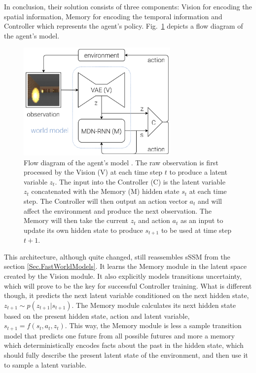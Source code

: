 In conclusion, their solution consists of three components: Vision for encoding the spatial information, Memory for encoding the temporal information and Controller which represents the agent's policy. Fig.~\ref{Fig.WorldModels} depicts a flow diagram of the agent's model.

\begin{figure}[H]
\includegraphics[width=0.7\textwidth,keepaspectratio]{figures/WorldModels.png}
\caption[Flow diagram of the World Models agent's model]{Flow diagram of the agent's model \protect\cite{Algo.WorldModels}. The raw observation is first processed by the Vision (V) at each time step $t$ to produce a latent variable $z_t$. The input into the Controller (C) is the latent variable $z_t$ concatenated with the Memory (M) hidden state $s_t$ at each time step. The Controller will then output an action vector $a_t$ and will affect the environment and produce the next observation. The Memory will then take the current $z_t$ and action $a_t$ as an input to update its own hidden state to produce $s_{t+1}$ to be used at time step $t + 1$.}
\label{Fig.WorldModels}
\end{figure}

This architecture, although quite changed, still reassembles sSSM from the section \ref{Sec.FastWorldModels}. It learns the Memory module in the latent space created by the Vision module. It also explicitly models transitions uncertainty, which will prove to be the key for successful Controller training. What is different though, it predicts the next latent variable conditioned on the next hidden state, $z_{t+1} \sim p(z_{t+1}|s_{t+1})$. The Memory module calculates its next hidden state based on the present hidden state, action and latent variable, $s_{t+1} = f(s_t, a_t, z_t)$. This way, the Memory module is less a sample transition model that predicts one future from all possible futures and more a memory which deterministically encodes facts about the past in the hidden state, which should fully describe the present latent state of the environment, and then use it to sample a latent variable.

